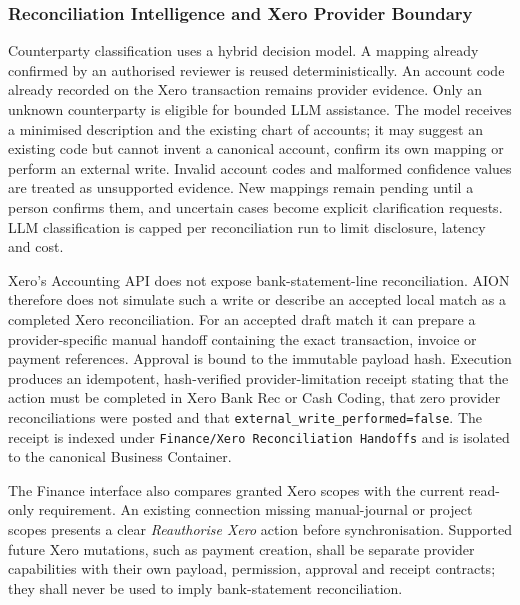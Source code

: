 \subsubsection{Reconciliation Intelligence and Xero Provider Boundary}

Counterparty classification uses a hybrid decision model.  A mapping already confirmed by an
authorised reviewer is reused deterministically.  An account code already recorded on the Xero
transaction remains provider evidence.  Only an unknown counterparty is eligible for bounded
LLM assistance.  The model receives a minimised description and the existing chart of accounts;
it may suggest an existing code but cannot invent a canonical account, confirm its own mapping
or perform an external write.  Invalid account codes and malformed confidence values are treated
as unsupported evidence.  New mappings remain pending until a person confirms them, and uncertain
cases become explicit clarification requests.  LLM classification is capped per reconciliation
run to limit disclosure, latency and cost.

Xero's Accounting API does not expose bank-statement-line reconciliation.  AION therefore does
not simulate such a write or describe an accepted local match as a completed Xero reconciliation.
For an accepted draft match it can prepare a provider-specific manual handoff containing the
exact transaction, invoice or payment references.  Approval is bound to the immutable payload
hash.  Execution produces an idempotent, hash-verified provider-limitation receipt stating that
the action must be completed in Xero Bank Rec or Cash Coding, that zero provider reconciliations
were posted and that \texttt{external\_write\_performed=false}.  The receipt is indexed under
\texttt{Finance/Xero Reconciliation Handoffs} and is isolated to the canonical Business Container.

The Finance interface also compares granted Xero scopes with the current read-only requirement.
An existing connection missing manual-journal or project scopes presents a clear
\emph{Reauthorise Xero} action before synchronisation.  Supported future Xero mutations, such as
payment creation, shall be separate provider capabilities with their own payload, permission,
approval and receipt contracts; they shall never be used to imply bank-statement reconciliation.
